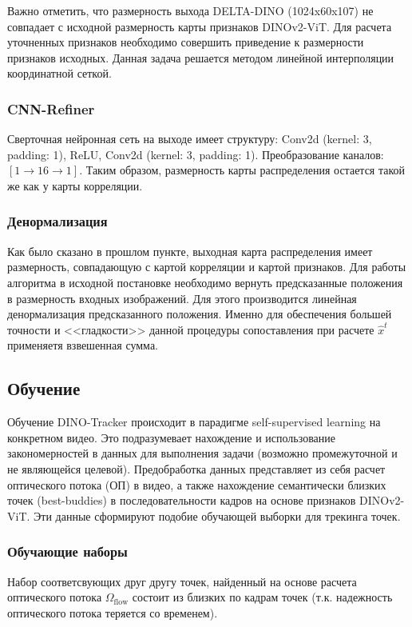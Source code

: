 \documentclass[a4paper, 14pt]{extarticle}
\theoremstyle{definition}
\theoremstyle{plain}
\theoremstyle{remark}
\begin{document}
Важно отметить, что размерность выхода DELTA-DINO (1024x60x107) не совпадает с исходной размерность карты признаков DINOv2-ViT. Для расчета уточненных признаков необходимо совершить приведение к размерности признаков исходных. Данная задача решается методом линейной интерполяции координатной сеткой.

\subsubsection{CNN-Refiner}
Сверточная нейронная сеть на выходе имеет структуру: Conv2d (kernel: 3, padding: 1), ReLU, Conv2d (kernel: 3, padding: 1). Преобразование каналов: $[1 \to 16 \to 1]$. Таким образом, размерность карты распределения остается такой же как у карты корреляции.



\subsubsection{Денормализация}
Как было сказано в прошлом пункте, выходная карта распределения имеет размерность, совпадающую с картой корреляции и картой признаков.
Для работы алгоритма в исходной постановке необходимо вернуть предсказанные положения в размерность входных изображений. Для этого производится линейная денормализация предсказанного положения. Именно для обеспечения большей точности и <<гладкости>> данной процедуры сопоставления при расчете $\hat{x}^t$ применяетя взвешенная сумма.

\subsection{Обучение}
Обучение DINO-Tracker происходит в парадигме self-supervised learning на конкретном видео. 
Это подразумевает нахождение и использование закономерностей в данных для выполнения задачи (возможно промежуточной и не являющейся целевой). 
Предобработка данных представляет из себя расчет оптического потока (ОП) в видео, а также нахождение семантически близких точек (best-buddies) в последовательности кадров на основе признаков DINOv2-ViT. Эти данные сформируют подобие обучающей выборки для трекинга точек.

\subsubsection{Обучающие наборы}
Набор соответсвующих друг другу точек, найденный на основе расчета оптического потока $\Omega_{\text{flow}}$ состоит из близких по кадрам точек (т.к. надежность оптического потока теряется со временем).
\end{document}
